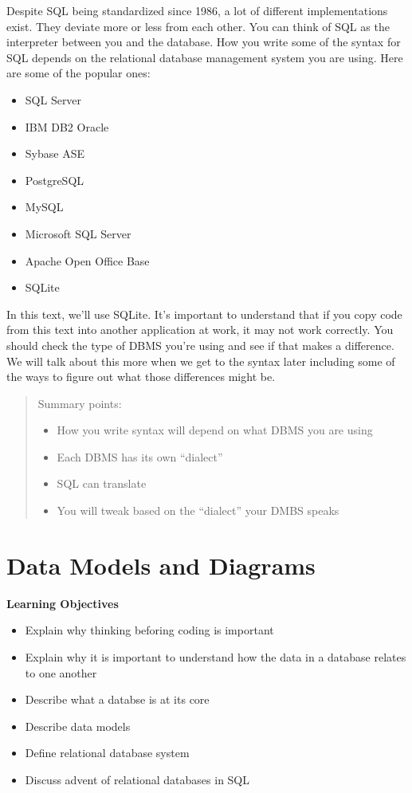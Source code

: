 \documentclass[]{book}
\providecommand{\tightlist}{%
  \setlength{\itemsep}{0pt}\setlength{\parskip}{0pt}}
\theoremstyle{definition}
\theoremstyle{definition}
\theoremstyle{remark}
\begin{document}
Despite SQL being standardized since 1986, a lot of different
implementations exist. They deviate more or less from each other. You
can think of SQL as the interpreter between you and the database. How
you write some of the syntax for SQL depends on the relational database
management system you are using. Here are some of the popular ones:

\begin{itemize}
\tightlist
\item
  SQL Server
\item
  IBM DB2 Oracle
\item
  Sybase ASE
\item
  PostgreSQL
\item
  MySQL
\item
  Microsoft SQL Server
\item
  Apache Open Office Base
\item
  SQLite
\end{itemize}

In this text, we'll use SQLite. It's important to understand that if you
copy code from this text into another application at work, it may not
work correctly. You should check the type of DBMS you're using and see
if that makes a difference. We will talk about this more when we get to
the syntax later including some of the ways to figure out what those
differences might be.

\begin{quote}
Summary points:

\begin{itemize}
\tightlist
\item
  How you write syntax will depend on what DBMS you are using
\item
  Each DBMS has its own ``dialect''
\item
  SQL can translate
\item
  You will tweak based on the ``dialect'' your DMBS speaks
\end{itemize}
\end{quote}

\chapter{Data Models and Diagrams}\label{data-models-and-diagrams}

\textbf{Learning Objectives}

\begin{itemize}
\tightlist
\item
  Explain why thinking beforing coding is important
\item
  Explain why it is important to understand how the data in a database
  relates to one another
\item
  Describe what a databse is at its core
\item
  Describe data models
\item
  Define relational database system
\item
  Discuss advent of relational databases in SQL
\end{itemize}
\end{document}
